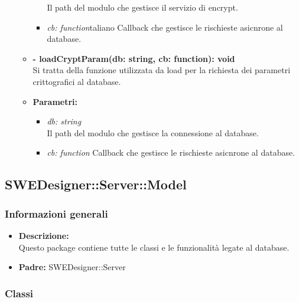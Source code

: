 \begin{itemize}
\begin{itemize}
\begin{itemize}
              Il path del modulo che gestisce il servizio di encrypt.
              \item \emph{cb: function}taliano
              Callback che gestisce le rischieste asicnrone al database.
            \end{itemize}
            \item \textbf{- loadCryptParam(db: string, cb: function): void}\\
            Si tratta della funzione utilizzata da load per la richiesta dei parametri crittografici al database.
            \item \textbf{Parametri:}\\
            \begin{itemize}
              \item \emph{db: string}\\
              Il path del modulo che gestisce la connessione al database.
              \item \emph{cb: function}
              Callback che gestisce le rischieste asicnrone al database.
            \end{itemize}
          \end{itemize}
        \end{itemize}
  \subsection{SWEDesigner::Server::Model}
    \subsubsection{Informazioni generali}
      \begin{itemize}
        \item \textbf{Descrizione:}\\
        Questo package contiene tutte le classi e le funzionalità legate al database.
        \item \textbf{Padre: }SWEDesigner::Server
      \end{itemize}
    \subsubsection{Classi}
